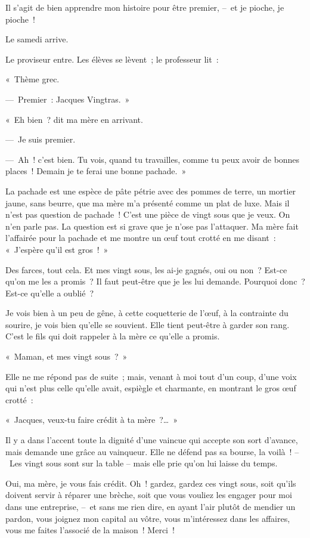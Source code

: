 \documentclass[french,twoside]{book} %
\begin{document}
\noindent Il s’agit de bien apprendre mon histoire pour être premier, – et je pioche, je pioche !\par
Le samedi arrive.\par
Le proviseur entre. Les élèves se lèvent ; le professeur lit :\par
« Thème grec.\par
— Premier : Jacques Vingtras. »\par
\bigbreak
\noindent « Eh bien ? dit ma mère en arrivant.\par
— Je suis premier.\par
— Ah ! c’est bien. Tu vois, quand tu travailles, comme tu peux avoir de bonnes places ! Demain je te ferai une bonne pachade. »\par
La pachade est une espèce de pâte pétrie avec des pommes de terre, un mortier jaune, sans beurre, que ma mère m’a présenté comme un plat de luxe. Mais il n’est pas question de pachade ! C’est une pièce de vingt sous que je veux. On n’en parle pas. La question est si grave que je n’ose pas l’attaquer. Ma mère fait l’affairée pour la pachade et me montre un œuf tout crotté en me disant : « J’espère qu’il est gros ! »\par
Des farces, tout cela. Et mes vingt sous, les ai-je gagnés, oui ou non ? Est-ce qu’on me les a promis ? Il faut peut-être que je les lui demande. Pourquoi donc ? Est-ce qu’elle a oublié ?\par
Je vois bien à un peu de gêne, à cette coquetterie de l’œuf, à la contrainte du sourire, je vois bien qu’elle se souvient. Elle tient peut-être à garder son rang. C’est le fils qui doit rappeler à la mère ce qu’elle a promis.\par
« Maman, et mes vingt sous ? »\par
Elle ne me répond pas de suite ; mais, venant à moi tout d’un coup, d’une voix qui n’est plus celle qu’elle avait, espiègle et charmante, en montrant le gros œuf crotté :\par
« Jacques, veux-tu faire crédit à ta mère ?… »\par
Il y a dans l’accent toute la dignité d’une vaincue qui accepte son sort d’avance, mais demande une grâce au vainqueur. Elle ne défend pas sa bourse, la voilà ! – Les vingt sous sont sur la table – mais elle prie qu’on lui laisse du temps.\par
Oui, ma mère, je vous fais crédit. Oh ! gardez, gardez ces vingt sous, soit qu’ils doivent servir à réparer une brèche, soit que vous vouliez les engager pour moi dans une entreprise, – et sans me rien dire, en ayant l’air plutôt de mendier un pardon, vous joignez mon capital au vôtre, vous m’intéressez dans les affaires, vous me faites l’associé de la maison ! Merci !\par
\end{document}
